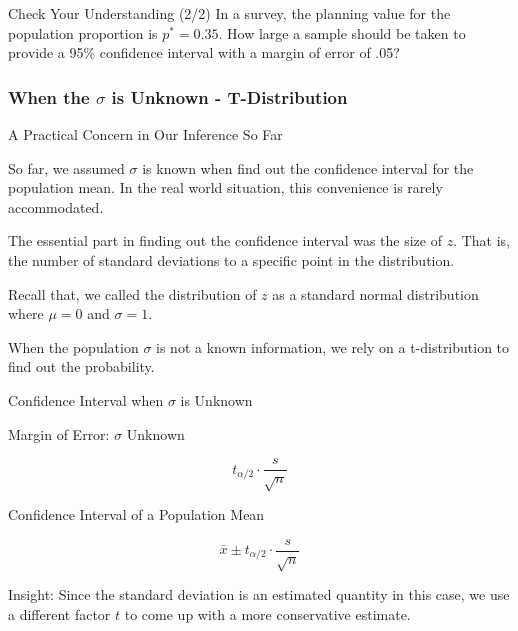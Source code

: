 \documentclass{beamer}
\begin{document}
\begin{frame}{Check Your Understanding (2/2)}
In a survey, the planning value for the population proportion is $p^* = 0.35$. How large a sample should be taken to provide a 95\% confidence interval with a margin of error of .05?


\end{frame}



\subsubsection{When the $\sigma$ is Unknown - T-Distribution}
\begin{frame}
\subsectionpage
\end{frame}


\begin{frame}{A Practical Concern in Our Inference So Far}

So far, we assumed $\sigma$ is known when find out the confidence interval for the population mean. In the real world situation, this convenience is rarely accommodated.

\vspace{0.3 cm}
The essential part in finding out the confidence interval was the size of $z$. That is, the number of standard deviations to a specific point in the distribution. 

\vspace{0.3 cm}
Recall that, we called the distribution of $z$ as a standard normal distribution where $\mu=0$ and $\sigma=1$. 

\vspace{0.3 cm}
When the population $\sigma$ is not a known information, we rely on a t-distribution to find out the probability. 

\end{frame}



\begin{frame}{Confidence Interval when $\sigma$ is Unknown}

Margin of Error: $\sigma$ Unknown 

$$ t_{\alpha/2}\cdot \frac{s}{\sqrt{n}} $$

Confidence Interval of a Population Mean

$$ \bar{x} \pm t_{\alpha/2}\cdot \frac{s}{\sqrt{n}} $$

Insight: Since the standard deviation is an estimated quantity in this case, we use a different factor $t$ to come up with a more conservative estimate.


\end{frame}
\end{document}
